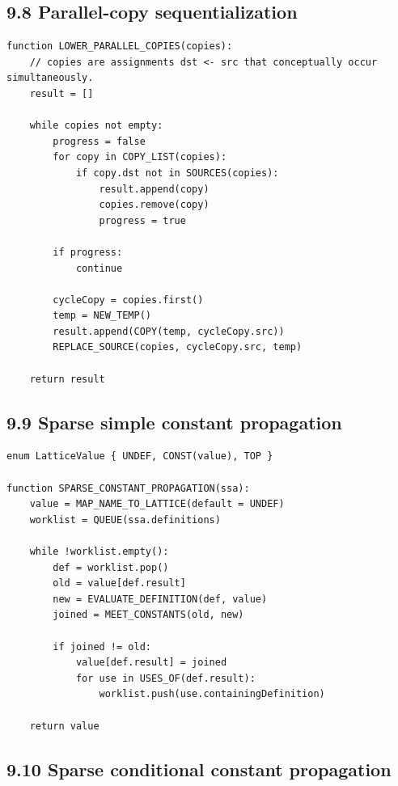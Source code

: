 \documentclass[10pt,letterpaper]{article}
\begin{document}
\subsection*{9.8 Parallel-copy sequentialization}

\begin{verbatim}
function LOWER_PARALLEL_COPIES(copies):
    // copies are assignments dst <- src that conceptually occur simultaneously.
    result = []

    while copies not empty:
        progress = false
        for copy in COPY_LIST(copies):
            if copy.dst not in SOURCES(copies):
                result.append(copy)
                copies.remove(copy)
                progress = true

        if progress:
            continue

        cycleCopy = copies.first()
        temp = NEW_TEMP()
        result.append(COPY(temp, cycleCopy.src))
        REPLACE_SOURCE(copies, cycleCopy.src, temp)

    return result
\end{verbatim}

\subsection*{9.9 Sparse simple constant propagation}

\begin{verbatim}
enum LatticeValue { UNDEF, CONST(value), TOP }

function SPARSE_CONSTANT_PROPAGATION(ssa):
    value = MAP_NAME_TO_LATTICE(default = UNDEF)
    worklist = QUEUE(ssa.definitions)

    while !worklist.empty():
        def = worklist.pop()
        old = value[def.result]
        new = EVALUATE_DEFINITION(def, value)
        joined = MEET_CONSTANTS(old, new)

        if joined != old:
            value[def.result] = joined
            for use in USES_OF(def.result):
                worklist.push(use.containingDefinition)

    return value
\end{verbatim}

\subsection*{9.10 Sparse conditional constant propagation}
\end{document}
